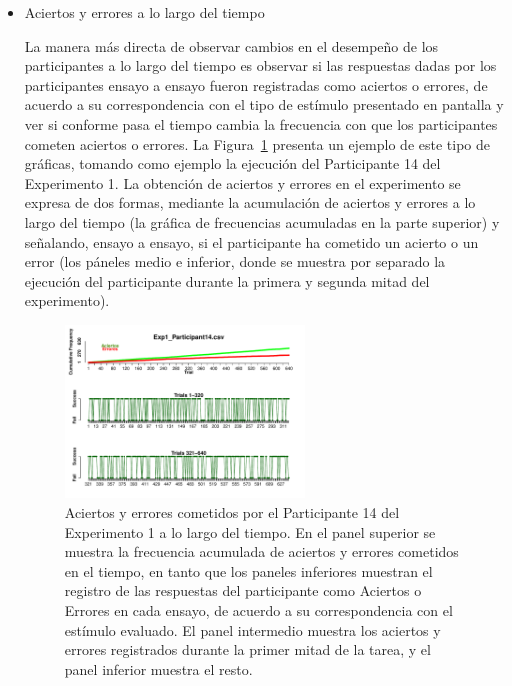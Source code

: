 \begin{itemize}
\item Aciertos y errores a lo largo del tiempo

La manera más directa de observar cambios en el desempeño de los participantes a lo largo del tiempo es observar si las respuestas dadas por los participantes ensayo a ensayo fueron registradas como aciertos o errores, de acuerdo a su correspondencia con el tipo de estímulo presentado en pantalla y ver si conforme pasa el tiempo cambia la frecuencia con que los participantes cometen aciertos o errores. La Figura~\ref{fig:Success_E1_P14} presenta un ejemplo de este tipo de gráficas, tomando como ejemplo la ejecución del Participante 14 del Experimento 1. La obtención de aciertos y errores en el experimento se expresa de dos formas, mediante la acumulación de aciertos y errores a lo largo del tiempo (la gráfica de frecuencias acumuladas en la parte superior) y señalando, ensayo a ensayo, si el participante ha cometido un acierto o un error (los páneles medio e inferior, donde se muestra por separado la ejecución del participante durante la primera y segunda mitad del experimento).


\begin{figure}[th]
\centering
\includegraphics[width=0.60\textwidth]{Figures/Success_Exp1_P14}
\caption[Aciertos y errores a lo largo del tiempo: Ejemplo]{Aciertos y errores cometidos por el Participante 14 del Experimento 1 a lo largo del tiempo. En el panel superior se muestra la frecuencia acumulada de aciertos y errores cometidos en el tiempo, en tanto que los paneles inferiores muestran el registro de las respuestas del participante como Aciertos o Errores en cada ensayo, de acuerdo a su correspondencia con el estímulo evaluado. El panel intermedio muestra los aciertos y errores registrados durante la primer mitad de la tarea, y el panel inferior muestra el resto.}
\label{fig:Success_E1_P14}
\end{figure}


\end{itemize}
